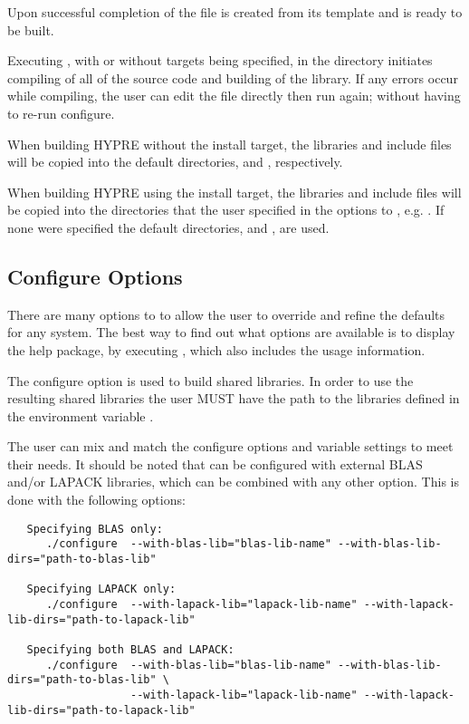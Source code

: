 Upon successful completion of  the file  
is created from its template  and \hypre{} is 
ready to be built.

Executing , with or without targets being specified, in the 
directory initiates compiling of all of the source code and building of the \hypre{} 
library.  If any errors occur while compiling, the user can edit the file 
 directly then run  again; without having to 
re-run configure.

When building HYPRE without the install target, the libraries and include files 
will be copied into the default directories,  and 
, respectively.

When building HYPRE using the install target, the libraries and include files 
will be copied into the directories that the user specified in the options to 
, e.g. .  If none were specified the default 
directories,  and , are used.


\subsection{Configure Options}

There are many options to  to allow the user to override and 
refine the defaults for any system. The best way to find out what options are 
available is to display the help package, by executing , which 
also includes the usage information.

The configure option   is used to build \hypre{} shared 
libraries.  In order to use the resulting shared libraries the user MUST have 
the path to the libraries defined in the environment variable . 

The user can mix and match the configure options and variable settings to meet their 
needs.  It should be noted that \hypre{} can be configured with external BLAS and/or
LAPACK libraries, which can be combined with any other option.  This is done with
the following options:

\begin{verbatim}
   Specifying BLAS only:
      ./configure  --with-blas-lib="blas-lib-name" --with-blas-lib-dirs="path-to-blas-lib"

   Specifying LAPACK only:
      ./configure  --with-lapack-lib="lapack-lib-name" --with-lapack-lib-dirs="path-to-lapack-lib"

   Specifying both BLAS and LAPACK:
      ./configure  --with-blas-lib="blas-lib-name" --with-blas-lib-dirs="path-to-blas-lib" \
                   --with-lapack-lib="lapack-lib-name" --with-lapack-lib-dirs="path-to-lapack-lib"
\end{verbatim}


